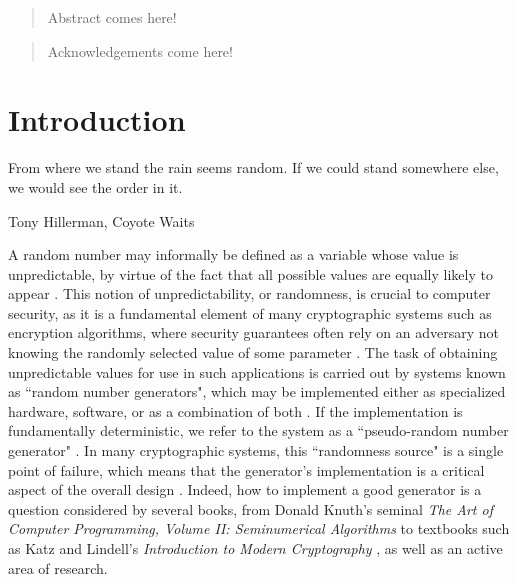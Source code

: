 \documentclass[12pt, titlepage]{report}
\theoremstyle{definition}
\begin{document}

\begin{abstract}
Abstract comes here!
\end{abstract}


\renewcommand{\abstractname}{Acknowledgements}
\begin{abstract}
Acknowledgements come here!
\end{abstract}



\tableofcontents
\clearpage



\chapter{Introduction}
\epigraph{From where we stand the rain seems random. If we could stand somewhere else, we would see the order in it.}{Tony Hillerman, Coyote Waits}

A random number may informally be defined as a variable whose value is unpredictable, by virtue of the fact that all possible values are equally likely to appear \cite[p. 7]{barker2007recommendation}. This notion of unpredictability, or randomness, is crucial to computer security, as it is a fundamental element of many cryptographic systems such as encryption algorithms, where security guarantees often rely on an adversary not knowing the randomly selected value of some parameter \cite[p. 169]{menezes1996handbook} \cite[p. 1]{kelsey1998cryptanalytic}. The task of obtaining unpredictable values for use in such applications is carried out by systems known as ``random number generators", which may be implemented either as specialized hardware, software, or as a combination of both \cite[p. 196, 172]{menezes1996handbook}. If the implementation is fundamentally deterministic, we refer to the system as a ``pseudo-random number generator" \cite[p. 169]{menezes1996handbook}. In many cryptographic systems, this ``randomness source" is a single point of failure, which means that the generator's implementation is a critical aspect of the overall design \cite[p. 2]{kelsey1998cryptanalytic}. Indeed, how to implement a good generator is a question considered by several books, from Donald Knuth's seminal \textit{The Art of Computer Programming, Volume II: Seminumerical Algorithms} \cite{donald1998art} to textbooks such as Katz and Lindell's \textit{Introduction to Modern Cryptography} \cite{katz2014introduction}, as well as an active area of research.
\end{document}
